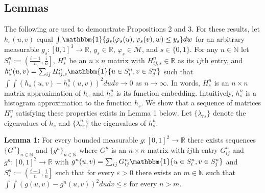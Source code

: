 \documentclass[12pt]{article}
\theoremstyle{definition}
\begin{document}
\subsection{Lemmas}
The following are used to demonstrate Propositions 2 and 3. For these results, let $h_{s}(u,v)$ equal $\int\mathbbm{1}\{g_{s}(\varphi_{s}(u),\varphi_{s}(v),w) \leq y_{s}\}dw$ for an arbitrary measurable $g_{s} : [0,1]^{3} \to \mathbb{R}$, $y_{s} \in \mathbb{R}$, $\varphi_{s} \in \mathcal{M}$, and $s \in \{0,1\}$. For any $n\in \mathbb{N}$ let $S_{i}^{n} := \left(\frac{i-1}{n},\frac{i}{n}\right]$, $H_{s}^{n}$ be an $n\times n$ matrix with $H_{ij,s}^{n} \in \mathbb{R}$ as its $ij$th entry, and $h_{s}^{n}(u,v) = \sum_{ij}H_{ij,s}^{n}\mathbbm{1}\{u \in S_{i}^{n}, v \in S_{j}^{n}\}$ such that $\int\int\left(h_{s}(u,v)-h_{s}^{n}(u,v)\right)^{2}dudv \to 0$ as $n\to\infty$. In words, $H_{s}^{n}$ is an $n\times n$ matrix approximation of $h_{s}$ and $h_{s}^{n}$ is its function embedding. Intuitively, $h^{n}_{s}$ is a histogram approximation to the function $h_{s}$. We show that a sequence of matrices $H_{s}^{n}$ satisfying these properties exists in Lemma 1 below. Let $\{\lambda_{rs}\}$ denote the eigenvalues of  $h_{s}$ and $\{\lambda^{n}_{rs}\}$ the eigenvalues of  $h_{s}^{n}$.   

\begin{flushleft}
\textbf{Lemma 1:} For every bounded measurable $g: [0,1]^{2} \to \mathbb{R}$ there exists sequences $\{G^{n}\}_{n \in \mathbb{N}}$ and $\{g^{n}\}_{n \in \mathbb{N}}$ where $G^{n}$ is an $n\times n$ matrix with $ij$th entry $G^{n}_{ij}$ and $g^{n}:[0,1]^{2}\to\mathbb{R}$ with $g^{n}(u,v) = \sum_{ij}G_{ij}^{n}\mathbbm{1}\{u \in S_{i}^{n}, v \in S_{j}^{n}\}$ and $S_{i}^{n} := \left(\frac{i-1}{n},\frac{i}{n}\right]$ such that for every $\varepsilon > 0$ there exists an $m \in \mathbb{N}$ such that $\int\int\left(g(u,v)-g^{n}(u,v)\right)^{2}dudv \leq \varepsilon$ for every $n > m$.  
\end{flushleft}
\end{document}
